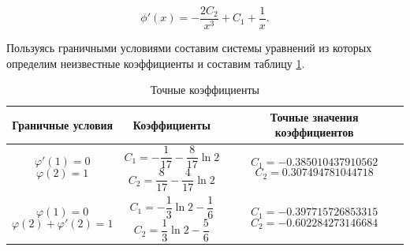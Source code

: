 \documentclass{article}
\begin{document}
\begin{equation}
	\phi'(x) = - \frac{2C_{2}}{x^3} + C_{1} + \frac{1}{x}.
\end{equation}

Пользуясь граничными условиями составим системы уравнений из которых определим неизвестные коэффициенты и составим таблицу \ref{table_exact_coefficients}. 

\begin{table}[!h]
\centering
\begin{tabular}{|c|c|c|}
	\hline
	Граничные условия &
	Коэффициенты & 
	Точные значения коэффициентов \\
	\hline \hline

\parbox[c]{3cm}{
	\begin{displaymath}
		\varphi'(1) = 0
	\end{displaymath}
	\begin{displaymath}
		\varphi(2) = 1
	\end{displaymath}
} &

\parbox[c]{3cm}{
 	\begin{displaymath}
 		C_{1} = - \frac{1}{17} - \frac{8}{17} \ln{2}
 	\end{displaymath}
	\begin{displaymath} 	
 		C_{2} = \frac{8}{17} - \frac{4}{17} \ln{2}
 	\end{displaymath}
 	} & 
 	
\parbox[c]{4.07cm}{
 	\begin{displaymath}
 		C_{1} = -0.385010437910562 
 	\end{displaymath}
 	\begin{displaymath}
 		C_{2} = 0.307494781044718
 	\end{displaymath}
 	}\\	\hline
	
\parbox[c]{3cm}{
	\begin{displaymath}
		\varphi(1) = 0
	\end{displaymath}
	\begin{displaymath}
		\varphi(2) + \varphi'(2) = 1
	\end{displaymath}
	} &

\parbox[c]{3cm}{
 	\begin{displaymath}
 		C_{1} = - \frac{1}{3} \ln{2} - \frac{1}{6} 
 	\end{displaymath}
	\begin{displaymath} 	
 		C_{2} = \frac{1}{3} \ln{2} - \frac{5}{6}
 	\end{displaymath}
 	} & 
 	
\parbox[c]{4.07cm}{
 	\begin{displaymath}
 		C_{1} = -0.397715726853315
 	\end{displaymath}
 	\begin{displaymath}
 		C_{2} = -0.602284273146684
 	\end{displaymath}
 	}\\	\hline
\end{tabular}
\caption{Точные коэффициенты}
\label{table_exact_coefficients}
\end{table}
\end{document}
